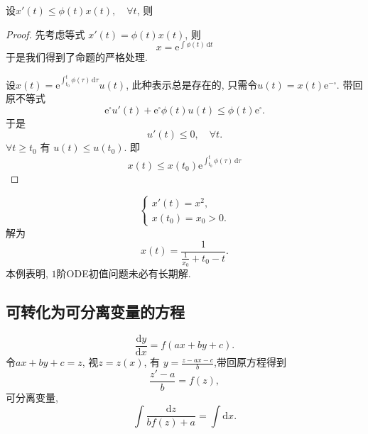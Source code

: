 \begin{proposition}
  设$x'(t) \le \phi (t) x(t),\quad \forall t$, 则

\end{proposition}
\begin{proof}
  先考虑等式 $x'(t) = \phi (t) x(t)$, 则
  \begin{equation}
    x = \mathrm{e}^{\int \phi (t)\, \mathrm{d} t}
  \end{equation}
  于是我们得到了命题的严格处理.

  设$x(t) = \mathrm{e}^{\int_{t_0}^{t} \phi (\tau ) \, \mathrm{d}\tau  } u(t)$, 此种表示总是存在的, 只需令$u(t) = x(t) \mathrm{e}^{- \square}$. 带回原不等式
  \begin{equation}
    \mathrm{e}^{\square} u'(t) + \mathrm{e}^{\square} \phi (t) u(t) \le \phi (t) \mathrm{e}^{\square}.
  \end{equation}
  于是
  \begin{equation}
    u'(t) \le 0, \quad \forall t.
  \end{equation}
  $\forall t \ge t_0$ 有 $u(t) \le u(t_0)$. 即
  \begin{equation}
    x(t) \le x(t_0) \mathrm{e}^{\int_{t_0}^{t} \phi (\tau ) \, \mathrm{d}\tau } 
  \end{equation}
\end{proof}

\begin{example}
  \begin{equation}
    \begin{cases}
      x'(t) = x^{2}, \\
      x(t_0) = x_0 > 0.
    \end{cases}
  \end{equation}
  解为
  \begin{equation}
    x(t) = \frac{1}{\frac{1}{x_0} + t_0 - t}.
  \end{equation}
  本例表明, $1$阶ODE初值问题未必有长期解.
\end{example}

\subsection{可转化为可分离变量的方程}
\begin{example}
  \begin{equation}
    \frac{\mathrm{d} y}{\mathrm{d} x} = f\left( ax + by + c \right).
  \end{equation}
  令$ax + by + c = z$, 视$z = z(x)$, 有 $y = \frac{z - ax - c}{b}$,带回原方程得到
  \begin{equation}
    \frac{z' - a}{b} = f(z),
  \end{equation}
  可分离变量,
  \begin{equation}
    \int \frac{\mathrm{d} z}{bf(z) + a} = \int \mathrm{d} x.
  \end{equation}
\end{example}

